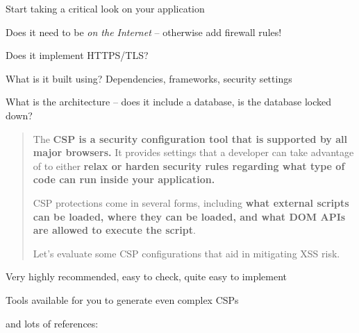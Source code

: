 \documentclass[Screen16to9,17pt]{foils}
\begin{document}


\begin{quote}

\end{quote}

Start taking a critical look on your application
\begin{list2}
\item Does it need to be \emph{on the Internet} -- otherwise add firewall rules!
\item Does it implement HTTPS/TLS?
\item What is it built using? Dependencies, frameworks, security settings
\item What is the architecture -- does it include a database, is the database locked down?
\end{list2}



\begin{quote}
The {\bf CSP is a security configuration tool that is supported by all major browsers.} It provides settings that a developer can take advantage of to either {\bf relax or harden security rules regarding what type of code can run inside your application.}

CSP protections come in several forms, including {\bf what external scripts can be loaded, where they can be loaded, and what DOM APIs are allowed to execute the script}.

Let’s evaluate some CSP configurations that aid in mitigating XSS risk.
\end{quote}

\begin{list2}
\item Very highly recommended, easy to check, quite easy to implement
\item Tools available for you to generate even complex CSPs
\item and lots of references:\\
\\
\end{list2}


\end{document}
